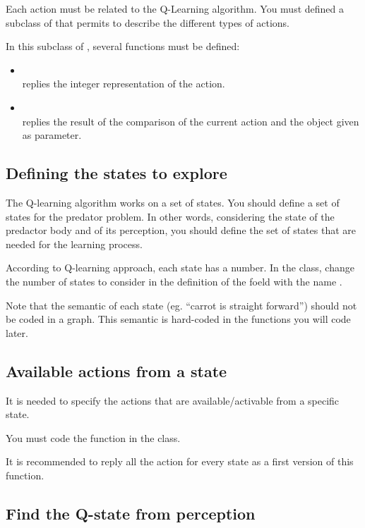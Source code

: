 \documentclass[article,english,nodocumentinfo]{multiagentfrreport}
\begin{document}
Each action must be related to the Q-Learning algorithm.
You must defined a subclass of  that permits to describe the different types of actions.

In this subclass of , several functions must be defined:
\begin{itemize}
\item {} \\
	replies the integer representation of the action.
\item {} \\
	replies the result of the comparison of the current action and the object given as parameter.
\end{itemize}

\subsection{Defining the states to explore}

The Q-learning algorithm works on a set of states.
You should define a set of states for the predator problem.
In other words, considering the state of the predactor body and of its perception, you should define the set of states that are needed for the learning process.

According to Q-learning approach, each state has a number.
In the  class, change the number of states to consider in the definition of the foeld with the name .

Note that the semantic of each state (eg. ``carrot is straight forward'') should not be coded in a graph. This semantic is hard-coded in the functions you will code later.

\subsection{Available actions from a state}

It is needed to specify the actions that are available/activable from a specific state.

You must code the function  in the  class.

It is recommended to reply all the action for every state as a first version of this function.

\subsection{Find the Q-state from perception}
\end{document}
